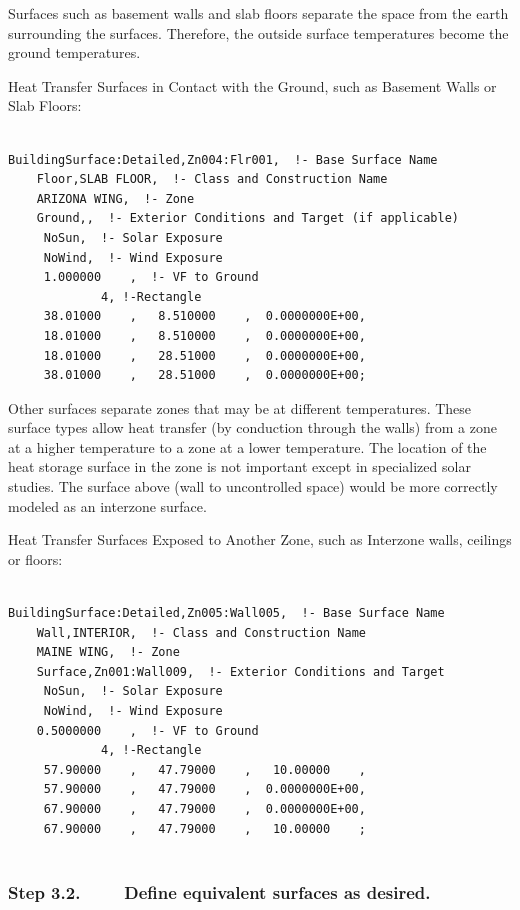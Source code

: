 Surfaces such as basement walls and slab floors separate the space from the earth surrounding the surfaces. Therefore, the outside surface temperatures become the ground temperatures.

Heat Transfer Surfaces in Contact with the Ground, such as Basement Walls or Slab Floors:

\begin{lstlisting}

BuildingSurface:Detailed,Zn004:Flr001,  !- Base Surface Name
    Floor,SLAB FLOOR,  !- Class and Construction Name
    ARIZONA WING,  !- Zone
    Ground,,  !- Exterior Conditions and Target (if applicable)
     NoSun,  !- Solar Exposure
     NoWind,  !- Wind Exposure
     1.000000    ,  !- VF to Ground
             4, !-Rectangle
     38.01000    ,   8.510000    ,  0.0000000E+00,
     18.01000    ,   8.510000    ,  0.0000000E+00,
     18.01000    ,   28.51000    ,  0.0000000E+00,
     38.01000    ,   28.51000    ,  0.0000000E+00;
\end{lstlisting}

Other surfaces separate zones that may be at different temperatures. These surface types allow heat transfer (by conduction through the walls) from a zone at a higher temperature to a zone at a lower temperature. The location of the heat storage surface in the zone is not important except in specialized solar studies. The surface above (wall to uncontrolled space) would be more correctly modeled as an interzone surface.

Heat Transfer Surfaces Exposed to Another Zone, such as Interzone walls, ceilings or floors:

\begin{lstlisting}

BuildingSurface:Detailed,Zn005:Wall005,  !- Base Surface Name
    Wall,INTERIOR,  !- Class and Construction Name
    MAINE WING,  !- Zone
    Surface,Zn001:Wall009,  !- Exterior Conditions and Target
     NoSun,  !- Solar Exposure
     NoWind,  !- Wind Exposure
    0.5000000    ,  !- VF to Ground
             4, !-Rectangle
     57.90000    ,   47.79000    ,   10.00000    ,
     57.90000    ,   47.79000    ,  0.0000000E+00,
     67.90000    ,   47.79000    ,  0.0000000E+00,
     67.90000    ,   47.79000    ,   10.00000    ;
   
\end{lstlisting}

\subsubsection{Step 3.2.~~~~ Define equivalent surfaces as desired.}\label{step-3.2.-define-equivalent-surfaces-as-desired.}

